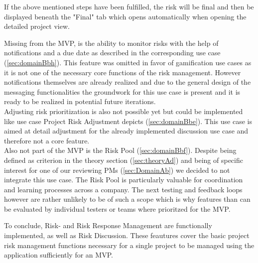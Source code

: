 If the above mentioned steps have been fulfilled, the risk will be final and then be displayed beneath the "Final" tab which opens automatically when opening the detailed project view.

 Missing from the MVP, is the ability to monitor risks with the help of notifications and a due date as described in the corresponding use case (\ref{sec:domainBbh}). This feature was omitted in favor of gamification use cases as it is not one of the necessary core functions of the risk management. However notifications themselves are already realized and due to the general design of the messaging functionalities the groundwork for this use case is present and it is ready to be realized in potential future iterations. \\
 Adjusting risk prioritization is also not possible yet but could be implemented like use case Project Risk Adjustment depicts (\ref{sec:domainBbe}). This use case is aimed at detail adjustment for the already implemented discussion use case and therefore not a core feature.\\
 Also not part of the MVP is the Risk Pool (\ref{sec:domainBbf}). Despite being defined as criterion in the theory section (\ref{sec:theoryAd}) and being of specific interest for one of our reviewing PMs  (\ref{sec:DomainAb}) we decided to not integrate this use case. The Risk Pool is particularly valuable for coordination and learning processes across a company. The next testing and feedback loops however are rather unlikely to be of such a scope which is why features than can be evaluated by individual testers or teams where prioritzed for the \ac{MVP}.
 
 To conclude, Risk- and Risk Response Management are functionally implemented, as well as Risk Discussion. These feautures cover the basic project risk management functions necessary for a single project to be managed using the application sufficiently for an \ac{MVP}.
 